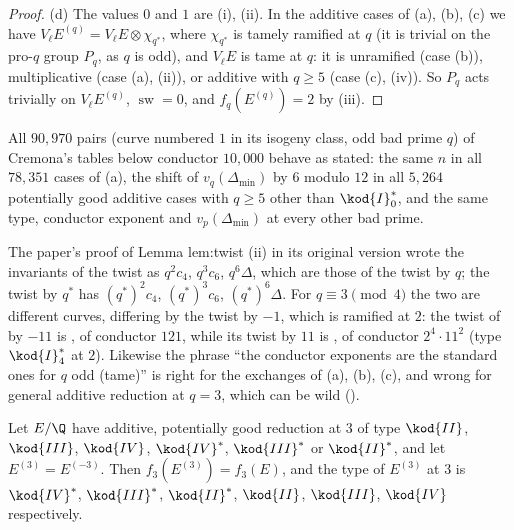 \begin{proof}
(d) The values $0$ and $1$ are (i), (ii). In the additive cases of (a), (b), (c) we have
$V_\ell E^{(q)}=V_\ell E\otimes\chi_{q^*}$, where $\chi_{q^*}$ is tamely ramified at $q$ (it is trivial on the pro-$q$ group $P_q$, as $q$ is
odd), and $V_\ell E$ is tame at $q$: it is unramified (case (b)), multiplicative (case (a), (ii)), or
additive with $q\ge5$ (case (c), (iv)). So $P_q$ acts trivially on $V_\ell E^{(q)}$,
$\operatorname{sw}=0$, and $f_q(E^{(q)})=2$ by (iii).
\end{proof}

All $90{,}970$ pairs (curve numbered $1$ in its isogeny class, odd bad prime $q$) of Cremona's tables below conductor $10{,}000$
behave as stated: the same $n$ in all $78{,}351$ cases of (a), the shift of $v_q(\Delta_{\min})$ by $6$ modulo $12$ in all $5{,}264$
potentially good additive cases with $q\ge5$ other than $\kod{I}_0^*$, and the same type, conductor exponent and $v_p(\Delta_{\min})$ at
every other bad prime.

\begin{warning}\label{warn:reduction:q-versus-qstar}
The paper's proof of Lemma lem:twist (ii) in its original version wrote the invariants of the twist as $q^2c_4$, $q^3c_6$, $q^6\Delta$,
which are those of the twist by $q$; the twist by $q^*$ has $(q^*)^2c_4$, $(q^*)^3c_6$, $(q^*)^6\Delta$. For $q\equiv3\pmod4$ the two are
different curves, differing by the twist by $-1$, which is ramified at $2$: the twist of  by $-11$ is , of
conductor $121$, while its twist by $11$ is , of conductor $2^4\cdot11^2$ (type $\kod{I}_4^*$ at $2$). Likewise the phrase
``the conductor exponents are the standard ones for $q$ odd (tame)'' is right for the exchanges of (a), (b), (c), and wrong for
general additive reduction at $q=3$, which can be wild ().
\end{warning}

\begin{proposition}[the exchanges at $q=3$]\label{prop:reduction:twist-at-3}
Let $E/\Q$ have additive, potentially good reduction at $3$ of type $\kod{II}$, $\kod{III}$, $\kod{IV}$, $\kod{IV}^*$, $\kod{III}^*$ or $\kod{II}^*$, and
let $E^{(3)}=E^{(-3)}$. Then $f_3(E^{(3)})=f_3(E)$, and the type of $E^{(3)}$ at $3$ is $\kod{IV}^*$, $\kod{III}^*$, $\kod{II}^*$, $\kod{II}$, $\kod{III}$,
$\kod{IV}$ respectively.
\end{proposition}

